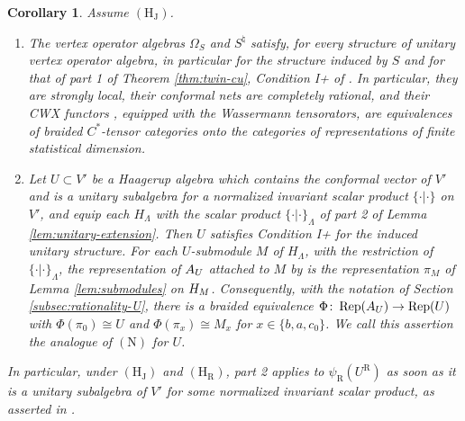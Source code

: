 \documentclass[leqno]{article}
\let\cal\relax
\newcommand{\cal}{\mathcal}
\newcommand{\co}{\colon}
\DeclareMathOperator{\Rep}{Rep} %
\newtheorem{cor}[thm]{Corollary}
\numberwithin{equation}{section}
\begin{document}
\begin{cor}
\label{cor:twin-comparison}
Assume $\mathrm{(H_J)}$.
\begin{enumerate}
\item The vertex operator algebras $\Omega_S$ and $S^\natural$ satisfy, for every structure of unitary vertex operator algebra, in particular for the structure induced by $S$ and for that of part 1 of Theorem \ref{thm:twin-cu}, Condition I+ of \cite[Definition 6.17 p.~70]{Gui25}. In particular, they are strongly local, their conformal nets are completely rational, and their CWX functors \cite[Theorem 4.24 p.~43]{Gui25}, equipped with the Wassermann tensorators, are equivalences of braided $C^*$-tensor categories onto the categories of representations of finite statistical dimension.
\item Let $U \subset V'$ be a Haagerup algebra which contains the conformal vector of $V'$ and is a unitary subalgebra for a normalized invariant scalar product $\{\cdot|\cdot\}$ on $V'$, and equip each $H_\Lambda$ with the scalar product $\{\cdot|\cdot\}_\Lambda$ of part 2 of Lemma \ref{lem:unitary-extension}. Then $U$ satisfies Condition I+ for the induced unitary structure. For each $U$-submodule $M$ of $H_\Lambda$, with the restriction of $\{\cdot|\cdot\}_\Lambda$, the representation of $\cal A_U$ attached to $M$ by \cite[Definition 4.22 p.~43]{Gui25} is the representation $\pi_M$ of Lemma \ref{lem:submodules} on $\cal H_M$. Consequently, with the notation of Section \ref{subsec:rationality-U}, there is a braided equivalence $\Phi \co \Rep(\cal A_U) \to \Rep(U)$ with $\Phi(\pi_0) \cong U$ and $\Phi(\pi_x) \cong M_x$ for $x \in \{b,a,c_0\}$. We call this assertion the analogue of $\mathrm{(N)}$ for $U$.
\end{enumerate}
In particular, under $\mathrm{(H_J)}$ and $\mathrm{(H_R)}$, part 2 applies to $\psi_{\mathrm R}(U^{\mathrm R})$ as soon as it is a unitary subalgebra of $V'$ for some normalized invariant scalar product, as asserted in \cite[Theorem 1 p.~1 and p.~4]{Rie26}.
\end{cor}
\end{document}
